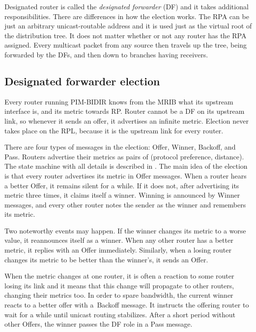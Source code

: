 Designated router is called the \emph{designated forwarder} (DF) and it takes additional
responsibilities. There are differences in how the election works. The RPA can be
just an arbitrary unicast-routable address and it is used just as the virtual root of the
distribution tree. It does not matter whether or not any router has the RPA
assigned. Every multicast packet from any source then travels up the tree,
being forwarded by the DFs, and then down to branches having receivers.

\subsection{Designated forwarder election}

Every router running PIM-BIDIR knows from the MRIB what its upstream interface is,
and its metric towards RP. Router cannot be a DF on its upstream link, so
whenever it sends an offer, it advertises an infinite metric. Election never takes place
on the RPL, because it is the upstream link for every router.

There are four types of messages in the election: Offer, Winner, Backoff, and
Pass. Routers advertise their metrics as pairs of (protocol preference, distance).
The state machine with all details is described in . The main idea of the
election is that every router advertises its metric in Offer messages. When
a router hears a better Offer, it remains silent for a while. If it does not, after
advertising its metric three times, it claims itself a winner. Winning is
announced by Winner messages, and every other router notes the sender as the
winner and remembers its metric.

Two noteworthy events may happen. If the winner changes its metric to a worse value,
it reannounces itself as a winner. When any other router has a better metric,
it replies with an Offer immediately. Similarly, when a losing router changes its
metric to be better than the winner's, it sends an Offer.

When the metric changes at one router, it is often a reaction to some router losing its
link and it means that this change will propagate to other routers, changing their
metrics too. In order to spare bandwidth, the current winner reacts to a better offer
with a~Backoff message. It instructs the offering router to wait for a while until
unicast routing stabilizes. After a short period without other Offers, the winner
passes the DF role in a Pass message.

